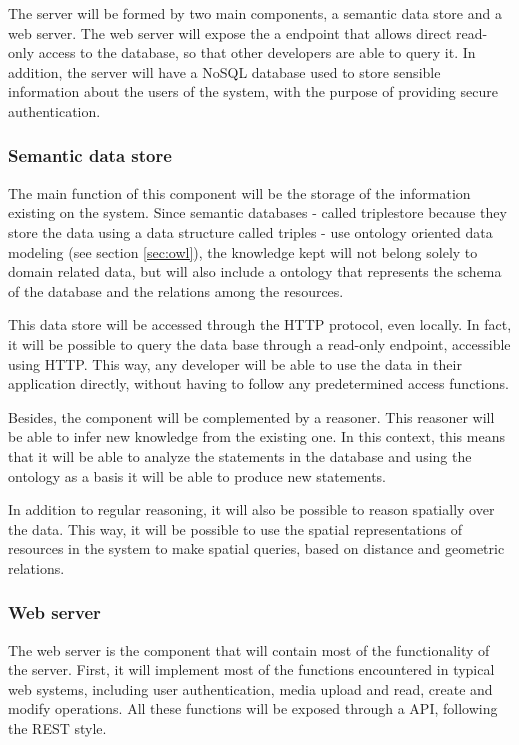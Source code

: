 The server will be formed by two main components, a semantic data store and a web server. The web server will expose the a endpoint that allows direct read-only access to the database, so that other developers are able to query it. In addition, the server will have a NoSQL database used to store sensible information about the users of the system, with the purpose of providing secure authentication.

\subsubsection*{Semantic data store}

The main function of this component will be the storage of the information existing on the system. Since semantic databases - called triplestore because they store the data using a data structure called triples - use ontology oriented data modeling (see section \ref{sec:owl}), the knowledge kept will not belong solely to domain related data, but will also include a ontology that represents the schema of the database and the relations among the resources.

This data store will be accessed through the HTTP protocol, even locally. In fact, it will be possible to query the data base through a read-only endpoint, accessible using HTTP. This way, any developer will be able to use the data in their application directly, without having to follow any predetermined access functions.

Besides, the component will be complemented by a reasoner. This reasoner will be able to infer new knowledge from the existing one. In this context, this means that it will be able to analyze the statements in the database and using the ontology as a basis it will be able to produce new statements.

In addition to regular reasoning, it will also be possible to reason spatially over the data. This way, it will be possible to use the spatial representations of resources in the system to make spatial queries, based on distance and geometric relations.

\subsubsection*{Web server}

The web server is the component that will contain most of the functionality of the server. First, it will implement most of the functions encountered in typical web systems, including user authentication, media upload and read, create and modify operations. All these functions will be exposed through a API, following the REST style.

